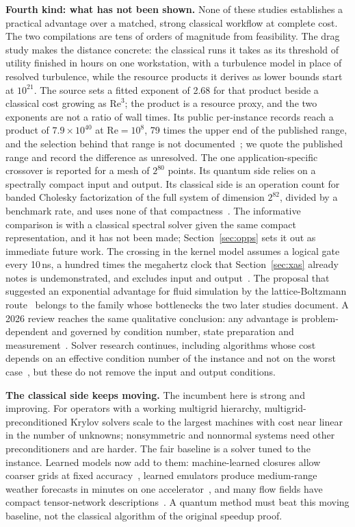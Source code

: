 \textbf{Fourth kind: what has not been shown.} None of these studies establishes a practical advantage over a matched, strong classical workflow at complete cost. The two compilations are tens of orders of magnitude from feasibility. The drag study makes the distance concrete: the classical runs it takes as its threshold of utility finished in hours on one workstation, with a turbulence model in place of resolved turbulence, while the resource products it derives as lower bounds start at $10^{21}$. The source sets a fitted exponent of 2.68 for that product beside a classical cost growing as $\mathrm{Re}^3$; the product is a resource proxy, and the two exponents are not a ratio of wall times. Its public per-instance records reach a product of $7.9\times10^{40}$ at $\mathrm{Re}=10^8$, 79 times the upper end of the published range, and the selection behind that range is not documented~\cite{qsub2025}; we quote the published range and record the difference as unresolved. The one application-specific crossover is reported for a mesh of $2^{80}$ points. Its quantum side relies on a spectrally compact input and output. Its classical side is an operation count for banded Cholesky factorization of the full system of dimension $2^{82}$, divided by a benchmark rate, and uses none of that compactness~\cite{zhuang2025}. The informative comparison is with a classical spectral solver given the same compact representation, and it has not been made; Section~\ref{sec:opps} sets it out as immediate future work. The crossing in the kernel model assumes a logical gate every 10\,ns, a hundred times the megahertz clock that Section~\ref{sec:xas} already notes is undemonstrated, and excludes input and output~\cite{tu2025}. The proposal that suggested an exponential advantage for fluid simulation by the lattice-Boltzmann route~\cite{li2025fluid} belongs to the family whose bottlenecks the two later studies document. A 2026 review reaches the same qualitative conclusion: any advantage is problem-dependent and governed by condition number, state preparation and measurement~\cite{cecile2026}. Solver research continues, including algorithms whose cost depends on an effective condition number of the instance and not on the worst case~\cite{dalzell2026}, but these do not remove the input and output conditions.

\textbf{The classical side keeps moving.} The incumbent here is strong and improving. For operators with a working multigrid hierarchy, multigrid-preconditioned Krylov solvers scale to the largest machines with cost near linear in the number of unknowns; nonsymmetric and nonnormal systems need other preconditioners and are harder. The fair baseline is a solver tuned to the instance. Learned models now add to them: machine-learned closures allow coarser grids at fixed accuracy~\cite{kochkov2021}, learned emulators produce medium-range weather forecasts in minutes on one accelerator~\cite{lam2023}, and many flow fields have compact tensor-network descriptions~\cite{mello2025}. A quantum method must beat this moving baseline, not the classical algorithm of the original speedup proof.

